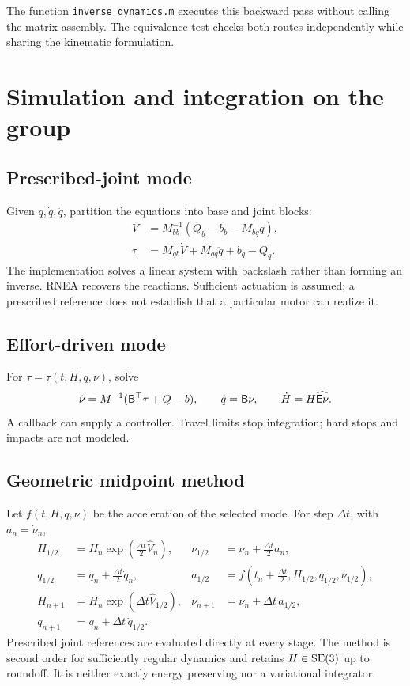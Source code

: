 \documentclass[11pt,a4paper]{article}
\begin{document}
The function \texttt{inverse\_dynamics.m} executes this backward pass
without calling the matrix assembly. The equivalence test checks both
routes independently while sharing the kinematic formulation.
\clearpage

\section{Simulation and integration on the group}
\subsection{Prescribed-joint mode}
Given \(q,\dot q,\ddot q\), partition the equations into base and joint
blocks:
\begin{align}
\dot V&=M_{bb}^{-1}(Q_b-b_b-M_{bq}\ddot q),\\
\tau&=M_{qb}\dot V+M_{qq}\ddot q+b_q-Q_q.
\end{align}
The implementation solves a linear system with backslash rather than
forming an inverse. RNEA recovers the reactions. Sufficient actuation
is assumed; a prescribed reference does not establish that a particular
motor can realize it.

\subsection{Effort-driven mode}
For \(\tau=\tau(t,H,q,\nu)\), solve
\begin{equation}
\dot\nu=M^{-1}(\mathsf B^\top\tau+Q-b),\qquad
\dot q=\mathsf B\nu,\qquad \dot H=H\widehat{\mathsf E\nu}.
\end{equation}
A callback can supply a controller. Travel limits stop integration;
hard stops and impacts are not modeled.

\subsection{Geometric midpoint method}
Let \(f(t,H,q,\nu)\) be the acceleration of the selected mode. For
step \(\Delta t\), with \(a_n=\dot\nu_n\),
\begin{align}
H_{1/2}&=H_n\exp(\tfrac{\Delta t}{2}\widehat V_n),&
\nu_{1/2}&=\nu_n+\tfrac{\Delta t}{2}a_n,\\
q_{1/2}&=q_n+\tfrac{\Delta t}{2}\dot q_n,&
a_{1/2}&=f(t_n+\tfrac{\Delta t}{2},H_{1/2},q_{1/2},\nu_{1/2}),\\
H_{n+1}&=H_n\exp(\Delta t\widehat V_{1/2}),&
\nu_{n+1}&=\nu_n+\Delta t\,a_{1/2},\\
q_{n+1}&=q_n+\Delta t\,\dot q_{1/2}.&&
\end{align}
Prescribed joint references are evaluated directly at every stage. The
method is second order for sufficiently regular dynamics and retains
\(H\in\mathrm{SE}(3)\) up to roundoff. It is neither exactly energy preserving nor
a variational integrator.
\end{document}
